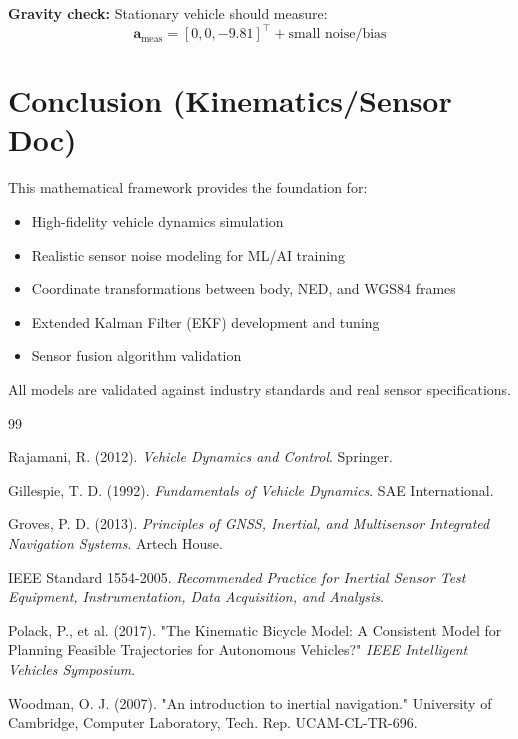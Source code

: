 \documentclass[11pt,a4paper]{article}
\begin{document}
\textbf{Gravity check:} Stationary vehicle should measure:
\begin{equation}
\mathbf{a}_{\text{meas}} = [0, 0, -9.81]^\top + \text{small noise/bias}
\end{equation}

\section{Conclusion (Kinematics/Sensor Doc)}

This mathematical framework provides the foundation for:
\begin{itemize}
    \item High-fidelity vehicle dynamics simulation
    \item Realistic sensor noise modeling for ML/AI training
    \item Coordinate transformations between body, NED, and WGS84 frames
    \item Extended Kalman Filter (EKF) development and tuning
    \item Sensor fusion algorithm validation
\end{itemize}

All models are validated against industry standards and real sensor specifications.

\begin{thebibliography}{99}

Rajamani, R. (2012). \textit{Vehicle Dynamics and Control}. Springer.

Gillespie, T. D. (1992). \textit{Fundamentals of Vehicle Dynamics}. SAE International.

Groves, P. D. (2013). \textit{Principles of GNSS, Inertial, and Multisensor Integrated Navigation Systems}. Artech House.

IEEE Standard 1554-2005. \textit{Recommended Practice for Inertial Sensor Test Equipment, Instrumentation, Data Acquisition, and Analysis}.

Polack, P., et al. (2017). "The Kinematic Bicycle Model: A Consistent Model for Planning Feasible Trajectories for Autonomous Vehicles?" \textit{IEEE Intelligent Vehicles Symposium}.

Woodman, O. J. (2007). "An introduction to inertial navigation." University of Cambridge, Computer Laboratory, Tech. Rep. UCAM-CL-TR-696.

\end{thebibliography}

\end{document}
